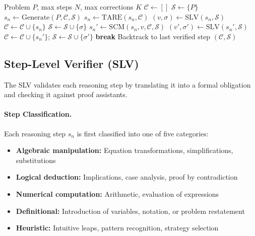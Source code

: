 \documentclass[11pt,a4paper]{article}
\begin{document}
\begin{algorithm}[t]
\caption{Verify-then-Generate Reasoning}
\label{alg:vtg}
\begin{algorithmic}[1]
\Require Problem $P$, max steps $N$, max corrections $K$
\State $\mathcal{C} \leftarrow []$ 
\State $\mathcal{S} \leftarrow \{P\}$ 
    \State $s_n \leftarrow \text{Generate}(P, \mathcal{C}, \mathcal{S})$ 
        \State $s_n \leftarrow \text{TARE}(s_n, \mathcal{C})$ 
    \EndIf
    \State $(v, \sigma) \leftarrow \text{SLV}(s_n, \mathcal{S})$ 
        \State $\mathcal{C} \leftarrow \mathcal{C} \cup \{s_n\}$
        \State $\mathcal{S} \leftarrow \mathcal{S} \cup \{\sigma\}$ 
    \Else
         
            \State $s_n' \leftarrow \text{SCM}(s_n, v, \mathcal{C}, \mathcal{S})$
            \State $(v', \sigma') \leftarrow \text{SLV}(s_n', \mathcal{S})$
                \State $\mathcal{C} \leftarrow \mathcal{C} \cup \{s_n'\}$; $\mathcal{S} \leftarrow \mathcal{S} \cup \{\sigma'\}$
                \State \textbf{break}
            \EndIf
        \EndFor
            \State Backtrack to last verified step
        \EndIf
    \EndIf
        \State \Return $(\mathcal{C}, \mathcal{S})$ 
    \EndIf
\EndFor
\end{algorithmic}
\end{algorithm}

\subsection{Step-Level Verifier (SLV)}
\label{sec:slv}

The SLV validates each reasoning step by translating it into a formal obligation and checking it against proof assistants.

\paragraph{Step Classification.} Each reasoning step $s_n$ is first classified into one of five categories:
\begin{itemize}
    \item \textbf{Algebraic manipulation:} Equation transformations, simplifications, substitutions
    \item \textbf{Logical deduction:} Implications, case analysis, proof by contradiction
    \item \textbf{Numerical computation:} Arithmetic, evaluation of expressions
    \item \textbf{Definitional:} Introduction of variables, notation, or problem restatement
    \item \textbf{Heuristic:} Intuitive leaps, pattern recognition, strategy selection
\end{itemize}
\end{document}
